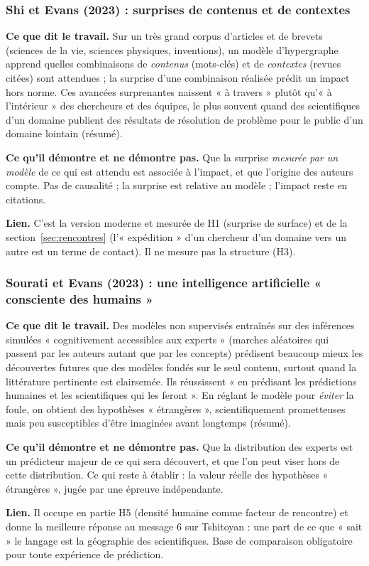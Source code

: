 \documentclass[a4paper,11pt]{article}
\newcommand{\cours}[1]{\par\smallskip\textbf{\textsf{#1}}\enspace}
\begin{document}
\subsubsection{Shi et Evans (2023) : surprises de contenus et de contextes}
\cours{Ce que dit le travail.} Sur un très grand corpus d'articles et de brevets (sciences de la vie, sciences physiques, inventions), un modèle d'hypergraphe apprend quelles combinaisons de \emph{contenus} (mots-clés) et de \emph{contextes} (revues citées) sont attendues ; la surprise d'une combinaison réalisée prédit un impact hors norme. Ces avancées surprenantes naissent « à travers » plutôt qu'« à l'intérieur » des chercheurs et des équipes, le plus souvent quand des scientifiques d'un domaine publient des résultats de résolution de problème pour le public d'un domaine lointain (résumé).
\cours{Ce qu'il démontre et ne démontre pas.} Que la surprise \emph{mesurée par un modèle} de ce qui est attendu est associée à l'impact, et que l'origine des auteurs compte. Pas de causalité ; la surprise est relative au modèle ; l'impact reste en citations.
\cours{Lien.} C'est la version moderne et mesurée de H1 (surprise de surface) et de la section~\ref{sec:rencontres} (l'« expédition » d'un chercheur d'un domaine vers un autre est un terme de contact). Il ne mesure pas la structure (H3).

\subsubsection{Sourati et Evans (2023) : une intelligence artificielle « consciente des humains »}
\cours{Ce que dit le travail.} Des modèles non supervisés entraînés sur des inférences simulées « cognitivement accessibles aux experts » (marches aléatoires qui passent par les auteurs autant que par les concepts) prédisent beaucoup mieux les découvertes futures que des modèles fondés sur le seul contenu, surtout quand la littérature pertinente est clairsemée. Ils réussissent « en prédisant les prédictions humaines et les scientifiques qui les feront ». En réglant le modèle pour \emph{éviter} la foule, on obtient des hypothèses « étrangères », scientifiquement prometteuses mais peu susceptibles d'être imaginées avant longtemps (résumé).
\cours{Ce qu'il démontre et ne démontre pas.} Que la distribution des experts est un prédicteur majeur de ce qui sera découvert, et que l'on peut viser hors de cette distribution. Ce qui reste à établir : la valeur réelle des hypothèses « étrangères », jugée par une épreuve indépendante.
\cours{Lien.} Il occupe en partie H5 (densité humaine comme facteur de rencontre) et donne la meilleure réponse au message 6 sur Tshitoyan : une part de ce que « sait » le langage est la géographie des scientifiques. Base de comparaison obligatoire pour toute expérience de prédiction.
\end{document}
